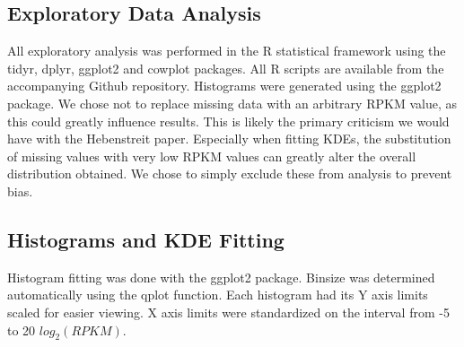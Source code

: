 \documentclass[12pt]{report}
\begin{document}


\subsection*{Exploratory Data Analysis}
All exploratory analysis was performed in the R statistical framework using the tidyr, dplyr, ggplot2 and cowplot packages.
All R scripts are available from the accompanying Github repository. Histograms were generated using the ggplot2
package. We chose not to replace missing data with an arbitrary RPKM value, as this could greatly influence results. This is likely the primary criticism we
would have with the Hebenstreit paper. Especially when fitting KDEs, the substitution of missing values with very low RPKM values can greatly
alter the overall distribution obtained. We chose to simply exclude these from analysis to prevent bias.


\subsection*{Histograms and KDE Fitting}
Histogram fitting was done with the ggplot2 package. Binsize was determined automatically using the qplot function. Each histogram had its Y axis limits scaled for easier viewing.
X axis limits were standardized on the interval from -5 to 20 $log_{2}(RPKM)$.
\end{document}
